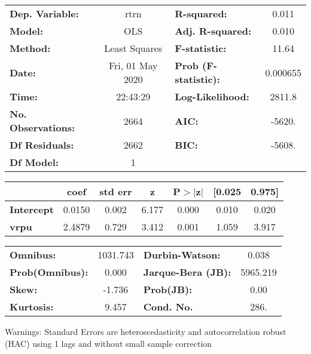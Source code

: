 \begin{center}
\begin{tabular}{lclc}
\toprule
\textbf{Dep. Variable:}    &       rtrn       & \textbf{  R-squared:         } &     0.011   \\
\textbf{Model:}            &       OLS        & \textbf{  Adj. R-squared:    } &     0.010   \\
\textbf{Method:}           &  Least Squares   & \textbf{  F-statistic:       } &     11.64   \\
\textbf{Date:}             & Fri, 01 May 2020 & \textbf{  Prob (F-statistic):} &  0.000655   \\
\textbf{Time:}             &     22:43:29     & \textbf{  Log-Likelihood:    } &    2811.8   \\
\textbf{No. Observations:} &        2664      & \textbf{  AIC:               } &    -5620.   \\
\textbf{Df Residuals:}     &        2662      & \textbf{  BIC:               } &    -5608.   \\
\textbf{Df Model:}         &           1      & \textbf{                     } &             \\
\bottomrule
\end{tabular}
\begin{tabular}{lcccccc}
                   & \textbf{coef} & \textbf{std err} & \textbf{z} & \textbf{P$> |$z$|$} & \textbf{[0.025} & \textbf{0.975]}  \\
\midrule
\textbf{Intercept} &       0.0150  &        0.002     &     6.177  &         0.000        &        0.010    &        0.020     \\
\textbf{vrpu}      &       2.4879  &        0.729     &     3.412  &         0.001        &        1.059    &        3.917     \\
\bottomrule
\end{tabular}
\begin{tabular}{lclc}
\textbf{Omnibus:}       & 1031.743 & \textbf{  Durbin-Watson:     } &    0.038  \\
\textbf{Prob(Omnibus):} &   0.000  & \textbf{  Jarque-Bera (JB):  } & 5965.219  \\
\textbf{Skew:}          &  -1.736  & \textbf{  Prob(JB):          } &     0.00  \\
\textbf{Kurtosis:}      &   9.457  & \textbf{  Cond. No.          } &     286.  \\
\bottomrule
\end{tabular}
\end{center}

Warnings: \newline
 [1] Standard Errors are heteroscedasticity and autocorrelation robust (HAC) using 1 lags and without small sample correction